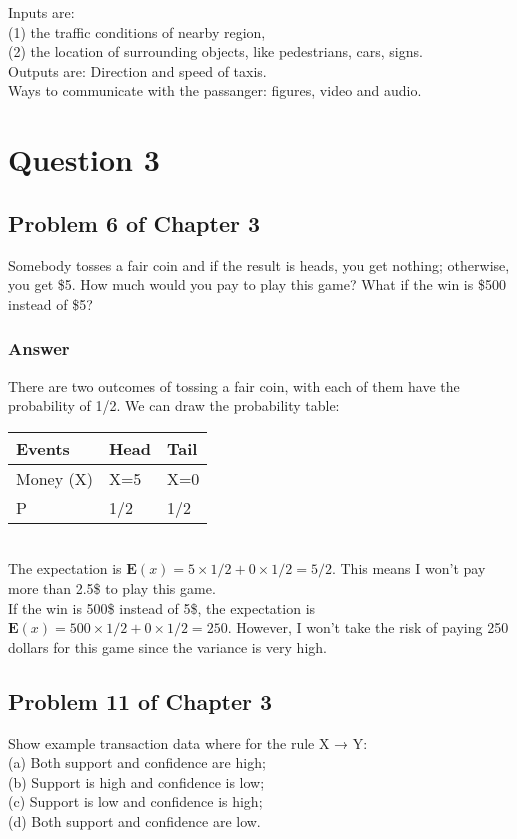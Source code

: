 \documentclass{article}
\begin{document}
\noindent Inputs are: \\(1) the traffic conditions of nearby region, \\(2) the location of surrounding objects, like pedestrians, cars, signs.\\

\noindent Outputs are: Direction and speed of taxis.\\

\noindent Ways to communicate with the passanger: figures, video and audio.

\section*{Question 3}
\subsection*{Problem 6 of Chapter 3}
Somebody tosses a fair coin and if the result is heads, you get nothing; otherwise, you get \$5. How much would you pay to play this game? What if the win is \$500 instead of \$5?

\subsubsection*{Answer}
There are two outcomes of tossing a fair coin, with each of them have the probability of 1/2. We can draw the probability table:
\begin{table}[h]
    \begin{tabular}{|l|l|l|}
    \hline
    Events & Head  & Tail  \\ \hline
    Money (X)  & X=5     & X=0     \\ \hline
    P      & 1/2 & 1/2 \\ \hline
    \end{tabular}
    \end{table}
\\The expectation is $\mathbf{E}(x) = 5\times 1/2 + 0 \times 1/2 = 5/2$. This means I won't pay more than 2.5\$ to play this game.
\\If the win is 500\$ instead of 5\$, the expectation is $\mathbf{E}(x) = 500\times 1/2 + 0 \times 1/2 = 250$. However, I won't take the risk of paying 250 dollars for this game since the variance is very high. 

\subsection*{Problem 11 of Chapter 3}
Show example transaction data where for the rule X → Y:\\
(a) Both support and confidence are high;\\
(b) Support is high and confidence is low;\\
(c) Support is low and confidence is high;\\ 
(d) Both support and confidence are low.
\end{document}
